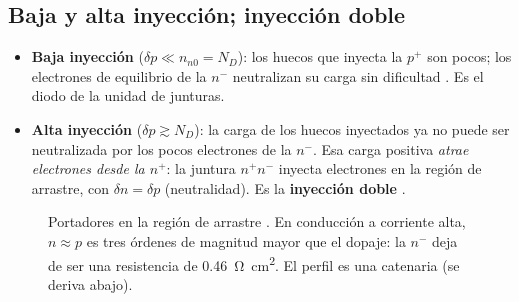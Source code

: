 \subsection{Baja y alta inyección; inyección doble}

\begin{itemize}
  \item \textbf{Baja inyección} ($\delta p\ll n_{n0}=N_D$): los huecos que inyecta la $p^+$ son pocos;
  los electrones de equilibrio de la $n^-$ neutralizan su carga sin dificultad . Es el diodo
  de la unidad de junturas.
  \item \textbf{Alta inyección} ($\delta p\gtrsim N_D$): la carga de los huecos inyectados ya no puede
  ser neutralizada por los pocos electrones de la $n^-$. Esa carga positiva \emph{atrae electrones
  desde la $n^+$}: la juntura $n^+n^-$ inyecta electrones en la región de arrastre, con
  $\delta n=\delta p$ (neutralidad). Es la \textbf{inyección doble} .
\end{itemize}

\begin{figure}[H]
\centering
{}
\caption{Portadores en la región de arrastre . En conducción a corriente alta, $n\approx p$
es tres órdenes de magnitud mayor que el dopaje: la $n^-$ deja de ser una resistencia de
\SI{0.46}{\ohm.cm^2}. El perfil es una catenaria (se deriva abajo).}
\label{fig:pin-perfil}
\end{figure}

